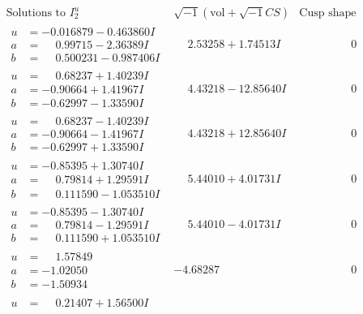 \documentclass[1p]{elsarticle_modified}
\theoremstyle{definition}
\newcommand{\I}{\sqrt{-1}}
\begin{document}
$$\begin{array}{c|c|c}
\text{Solutions to }I^u_{2}& \I (\text{vol} + \sqrt{-1}CS) & \text{Cusp shape}\\
 \hline 
\begin{aligned}
u &= -0.016879 - 0.463860 I \\
a &= \phantom{-}0.99715 - 2.36389 I \\
b &= \phantom{-}0.500231 - 0.987406 I\end{aligned}
 & \phantom{-}2.53258 + 1.74513 I & \phantom{-0.000000 } 0 \\ \hline\begin{aligned}
u &= \phantom{-}0.68237 + 1.40239 I \\
a &= -0.90664 + 1.41967 I \\
b &= -0.62997 - 1.33590 I\end{aligned}
 & \phantom{-}4.43218 - 12.85640 I & \phantom{-0.000000 } 0 \\ \hline\begin{aligned}
u &= \phantom{-}0.68237 - 1.40239 I \\
a &= -0.90664 - 1.41967 I \\
b &= -0.62997 + 1.33590 I\end{aligned}
 & \phantom{-}4.43218 + 12.85640 I & \phantom{-0.000000 } 0 \\ \hline\begin{aligned}
u &= -0.85395 + 1.30740 I \\
a &= \phantom{-}0.79814 + 1.29591 I \\
b &= \phantom{-}0.111590 - 1.053510 I\end{aligned}
 & \phantom{-}5.44010 + 4.01731 I & \phantom{-0.000000 } 0 \\ \hline\begin{aligned}
u &= -0.85395 - 1.30740 I \\
a &= \phantom{-}0.79814 - 1.29591 I \\
b &= \phantom{-}0.111590 + 1.053510 I\end{aligned}
 & \phantom{-}5.44010 - 4.01731 I & \phantom{-0.000000 } 0 \\ \hline\begin{aligned}
u &= \phantom{-}1.57849\phantom{ +0.000000I} \\
a &= -1.02050\phantom{ +0.000000I} \\
b &= -1.50934\phantom{ +0.000000I}\end{aligned}
 & -4.68287\phantom{ +0.000000I} & \phantom{-0.000000 } 0 \\ \hline\begin{aligned}
u &= \phantom{-}0.21407 + 1.56500 I \\

\end{aligned}
\end{array}$$
\end{document}
